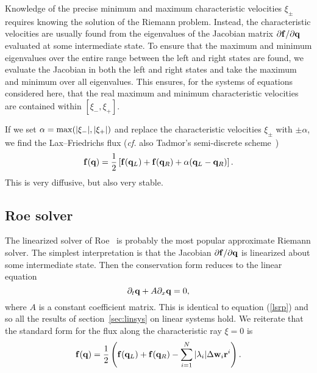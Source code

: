 \documentclass{article}
\begin{document}
Knowledge of the precise minimum and maximum characteristic velocities
$\xi_{\pm}$ requires knowing the solution of the Riemann problem.
Instead, the characteristic velocities are usually found from the
eigenvalues of the Jacobian matrix $\partial {\bf f} / \partial {\bf
  q}$ evaluated at some intermediate state. To ensure that the maximum
and minimum eigenvalues over the entire range between the left and
right states are found, we evaluate the Jacobian in both the left and
right states and take the maximum and minimum over all eigenvalues.
This ensures, for the systems of equations considered here, that the
real maximum and minimum characteristic velocities are contained
within $[\xi_-, \xi_+]$.

If we set $\alpha = {\rm max}(|\xi_-|, |\xi_+|)$ and replace the
characteristic velocities $\xi_{\pm}$ with $\pm \alpha$, we find the
Lax--Friedrichs flux ({\it cf.} also Tadmor's semi-discrete scheme~\cite{Tadmor00})
\begin{equation}
  \label{lfflux}
  {\bf f}({\bf q}) = \frac{1}{2} \left[ {\bf f}({\bf q}_L) + {\bf f}({\bf
  q}_R) + \alpha ({\bf q}_L -{\bf q}_R) \right].
\end{equation}
\noindent This is very diffusive, but also very stable.


\subsection{Roe solver}
\label{sec:roe}

The linearized solver of Roe~\cite{Roe81} is probably the most popular
approximate Riemann solver. The simplest interpretation is that the
Jacobian $\partial {\bf f} / \partial {\bf q}$ is linearized about
some intermediate state. Then the conservation form reduces to the
linear equation
\begin{equation}
  \label{roe1}
  \partial_t {\bf q} + A \partial_x {\bf q} = 0,
\end{equation}
\noindent where $A$ is a constant coefficient matrix. This is
identical to equation (\ref{lsrp}) and so all the results of
section~\ref{sec:linsys} on linear systems hold. We reiterate that the
standard form for the flux along the characteristic ray $\xi=0$ is
\begin{equation}
  \label{roe2}
  {\bf f}({\bf q}) = \frac{1}{2} \left( {\bf f}({\bf q}_L) + {\bf f}({\bf
  q}_R) - \sum_{i=1}^N | \lambda_i | \Delta {\bf w}_i {\bf r}^i \right).
\end{equation} 
\end{document}

